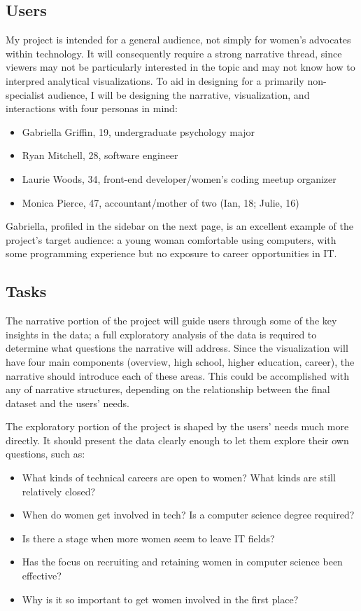 \subsection{Users}
My project is intended for a general audience, not simply for women’s advocates within technology. It will consequently require a strong narrative thread, since viewers may not be particularly interested in the topic and may not know how to interpred analytical visualizations. To aid in designing for a primarily non-specialist audience, I will be designing the narrative, visualization, and interactions with four personas in mind:
\begin{itemize}
  \item Gabriella Griffin, 19, undergraduate psychology major
  \item Ryan Mitchell, 28, software engineer
  \item Laurie Woods, 34, front-end developer/women’s coding meetup organizer
  \item Monica Pierce, 47, accountant/mother of two (Ian, 18; Julie, 16)
\end{itemize}

Gabriella, profiled in the sidebar on the next page, is an excellent example of the project’s target audience: a young woman comfortable using computers, with some programming experience but no exposure to career opportunities in IT\@.


\subsection{Tasks}
The narrative portion of the project will guide users through some of the key insights in the data; a full exploratory analysis of the data is required to determine what questions the narrative will address. Since the visualization will have four main components (overview, high school, higher education, career), the narrative should introduce each of these areas. This could be accomplished with any of \citet{SegelHeer2010Narrative} narrative structures, depending on the relationship between the final dataset and the users’ needs.

The exploratory portion of the project is shaped by the users’ needs much more directly. It should present the data clearly enough to let them explore their own questions, such as:

\begin{itemize}
  \item What kinds of technical careers are open to women? What kinds are still relatively closed?
  \item When do women get involved in tech? Is a computer science degree required?
  \item Is there a stage when more women seem to leave IT fields?
  \item Has the focus on recruiting and retaining women in computer science been effective?
  \item Why is it so important to get women involved in the first place?
\end{itemize}

